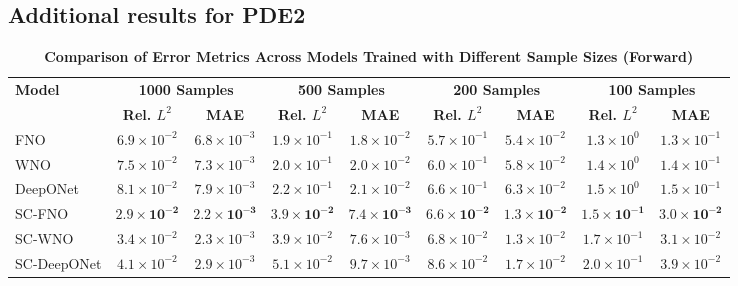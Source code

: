 \subsection*{Additional results for PDE2}
\begin{table}[ht!]
\centering
\caption{\textbf{Comparison of Error Metrics Across Models Trained with Different Sample Sizes (Forward)}}
\label{tab:pde2_forward_nostd}
\scriptsize
\setlength{\tabcolsep}{3pt}
\begin{tabular}{lcccccccc}
\hline
\textbf{Model} & \multicolumn{2}{c}{\textbf{1000 Samples}} & \multicolumn{2}{c}{\textbf{500 Samples}} & \multicolumn{2}{c}{\textbf{200 Samples}} & \multicolumn{2}{c}{\textbf{100 Samples}} \\
 & \textbf{Rel. \(L^2\)} & \textbf{MAE} & \textbf{Rel. \(L^2\)} & \textbf{MAE} & \textbf{Rel. \(L^2\)} & \textbf{MAE} & \textbf{Rel. \(L^2\)} & \textbf{MAE} \\
\hline
FNO        & \(6.9 \times 10^{-2}\) & \(6.8 \times 10^{-3}\) & \(1.9 \times 10^{-1}\) & \(1.8 \times 10^{-2}\) & \(5.7 \times 10^{-1}\) & \(5.4 \times 10^{-2}\) & \(1.3 \times 10^{0}\) & \(1.3 \times 10^{-1}\) \\
WNO        & \(7.5 \times 10^{-2}\) & \(7.3 \times 10^{-3}\) & \(2.0 \times 10^{-1}\) & \(2.0 \times 10^{-2}\) & \(6.0 \times 10^{-1}\) & \(5.8 \times 10^{-2}\) & \(1.4 \times 10^{0}\) & \(1.4 \times 10^{-1}\) \\
DeepONet   & \(8.1 \times 10^{-2}\) & \(7.9 \times 10^{-3}\) & \(2.2 \times 10^{-1}\) & \(2.1 \times 10^{-2}\) & \(6.6 \times 10^{-1}\) & \(6.3 \times 10^{-2}\) & \(1.5 \times 10^{0}\) & \(1.5 \times 10^{-1}\) \\
SC-FNO     & \(\mathbf{2.9 \times 10^{-2}}\)& \(\mathbf{2.2 \times 10^{-3}}\) & \(\mathbf{3.9 \times 10^{-2}}\) & \(\mathbf{7.4 \times 10^{-3}}\) & \(\mathbf{6.6 \times 10^{-2}}\) & \(\mathbf{1.3 \times 10^{-2}}\) & \(\mathbf{1.5 \times 10^{-1}}\) & \(\mathbf{3.0 \times 10^{-2}}\) \\
SC-WNO     & \(3.4\times 10^{-2}\)& \(2.3 \times 10^{-3}\) & \(3.9 \times 10^{-2}\) & \(7.6 \times 10^{-3}\) & \(6.8 \times 10^{-2}\) & \(1.3 \times 10^{-2}\) & \(1.7 \times 10^{-1}\) & \(3.1 \times 10^{-2}\) \\
SC-DeepONet& \(4.1 \times 10^{-2}\)& \(2.9 \times 10^{-3}\) & \(5.1 \times 10^{-2}\) & \(9.7 \times 10^{-3}\) & \(8.6 \times 10^{-2}\) & \(1.7 \times 10^{-2}\) & \(2.0 \times 10^{-1}\) & \(3.9 \times 10^{-2}\) \\
\hline
\end{tabular}
\end{table}




